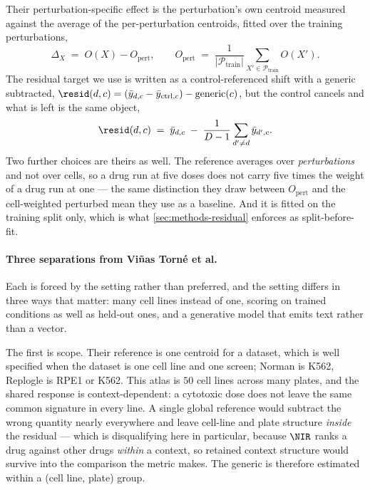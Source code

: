 Their perturbation-specific effect is
the perturbation's own centroid measured against the average of the
per-perturbation centroids, fitted over the training perturbations,
\begin{equation}
 \Delta_X \;=\; O(X) - O_{\textrm{pert}},
 \qquad
 O_{\textrm{pert}} \;=\; \frac{1}{|\mathcal{P}_{\textrm{train}}|}
   \sum_{X' \in \mathcal{P}_{\textrm{train}}} O(X') .
\end{equation}
The residual target we use is written as a control-referenced shift with a generic
subtracted, $\resid(d,c) = (\bar{y}_{d,c} - \bar{y}_{\textrm{ctrl},c}) -
\textrm{generic}(c)$, but the control cancels and what is left is the same
object,
\begin{equation}
 \resid(d,c) \;=\; \bar{y}_{d,c} \;-\; \frac{1}{D-1}\sum_{d' \neq d} \bar{y}_{d',c} .
\end{equation}
Two further choices are theirs as well. The reference averages over
\emph{perturbations} and not over cells, so a drug run at five doses does not
carry five times the weight of a drug run at one --- the same distinction they
draw between $O_{\textrm{pert}}$ and the cell-weighted perturbed mean they use as
a baseline. And it is fitted on the training split only, which is what
\cref{sec:methods-residual} enforces as split-before-fit.

\paragraph{Three separations from Vi\~nas Torn\'e et al.}
Each is forced by the
setting rather than preferred, and the setting differs in three ways that matter:
many cell lines instead of one, scoring on trained conditions as well as
held-out ones, and a generative model that emits text rather than a vector.

The first is scope. Their reference is one centroid for a dataset, which is
well specified when the dataset is one cell line and one screen; Norman is K562,
Replogle is RPE1 or K562. This atlas is $\num{50}$ cell lines across many plates,
and the shared response is context-dependent: a cytotoxic dose does not leave the
same common signature in every line. A single global reference would subtract the
wrong quantity nearly everywhere and leave cell-line and plate structure
\emph{inside} the residual --- which is disqualifying here in particular, because
$\NIR$ ranks a drug against other drugs \emph{within} a context, so retained
context structure would survive into the comparison the metric makes. The generic
is therefore estimated within a (cell line, plate) group.

